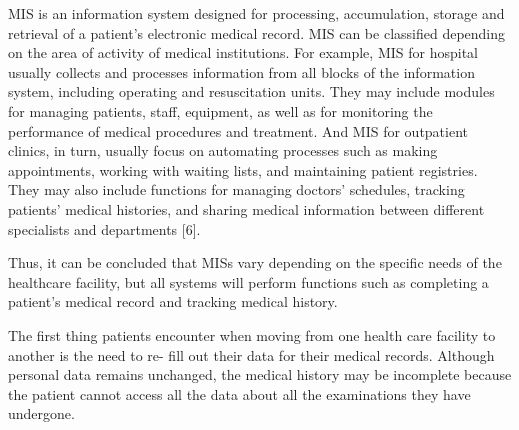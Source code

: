 \documentclass[10pt, a4paper]{article}
\begin{document}
\begin{multicols}{2}
\par MIS is an information system designed for processing,
accumulation, storage and retrieval of a patient’s electronic medical record. MIS can be classified depending
on the area of activity of medical institutions. For example, MIS for hospital usually collects and processes
information from all blocks of the information system,
including operating and resuscitation units. They may
include modules for managing patients, staff, equipment,
as well as for monitoring the performance of medical
procedures and treatment. And MIS for outpatient clinics,
in turn, usually focus on automating processes such as
making appointments, working with waiting lists, and
maintaining patient registries. They may also include
functions for managing doctors’ schedules, tracking patients’ medical histories, and sharing medical information
between different specialists and departments [6].
\par Thus, it can be concluded that MISs vary depending
on the specific needs of the healthcare facility, but all
systems will perform functions such as completing a
patient’s medical record and tracking medical history.
\par The first thing patients encounter when moving from
one health care facility to another is the need to re-
fill out their data for their medical records. Although
personal data remains unchanged, the medical history
may be incomplete because the patient cannot access all
the data about all the examinations they have undergone.
\clearpage


\end{multicols}
\end{document}
